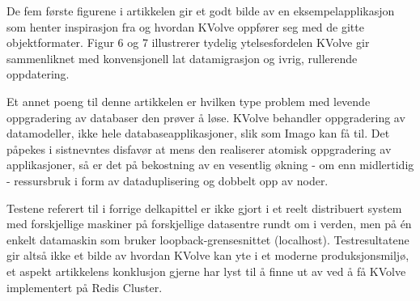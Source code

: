 De fem første figurene i artikkelen gir et godt bilde av en eksempelapplikasjon som henter inspirasjon fra \cite{sadalage2013} og hvordan KVolve oppfører seg med de gitte objektformater. Figur 6 og 7 illustrerer tydelig ytelsesfordelen KVolve gir sammenliknet med konvensjonell lat datamigrasjon og ivrig, rullerende oppdatering.

Et annet poeng til denne artikkelen er hvilken type problem med levende oppgradering av databaser den prøver å løse. KVolve behandler oppgradering av datamodeller, ikke hele databaseapplikasjoner, slik som Imago kan få til. Det påpekes i sistnevntes disfavør at mens den realiserer atomisk oppgradering av applikasjoner, så er det på bekostning av en vesentlig økning - om enn midlertidig - ressursbruk i form av dataduplisering og dobbelt opp av noder.

Testene referert til i forrige delkapittel er ikke gjort i et reelt distribuert system med forskjellige maskiner på forskjellige datasentre rundt om i verden, men på én enkelt datamaskin som bruker loopback-grensesnittet (localhost). Testresultatene gir altså ikke et bilde av hvordan KVolve kan yte i et moderne produksjonsmiljø, et aspekt artikkelens konklusjon gjerne har lyst til å finne ut av ved å få KVolve implementert på Redis Cluster.
